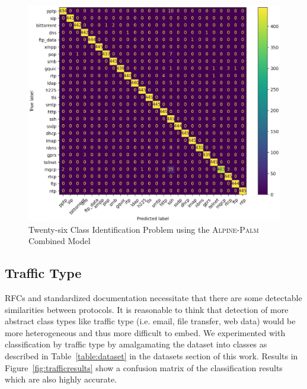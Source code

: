 \begin{figure} [ht!]
  \centering
  \includegraphics[width=\columnwidth]{chapters/4/img/combined.png}
  \caption{Twenty-six Class Identification Problem using the \textsc{Alpine}-\textsc{Palm} Combined Model}
  \label{fig:combined}
\end{figure}

\subsection{Traffic Type}

RFCs and standardized documentation necessitate that there are some detectable similarities between protocols. It is reasonable to think that detection of more abstract class types like traffic type (i.e. email, file transfer, web data) would be more heterogeneous and thus more difficult to embed. We experimented with classification by traffic type by amalgamating the dataset into classes as described in Table~\ref{table:dataset} in the datasets section of this work. Results in Figure~\ref{fig:trafficresults} show a confusion matrix of the classification results which are also highly accurate.

